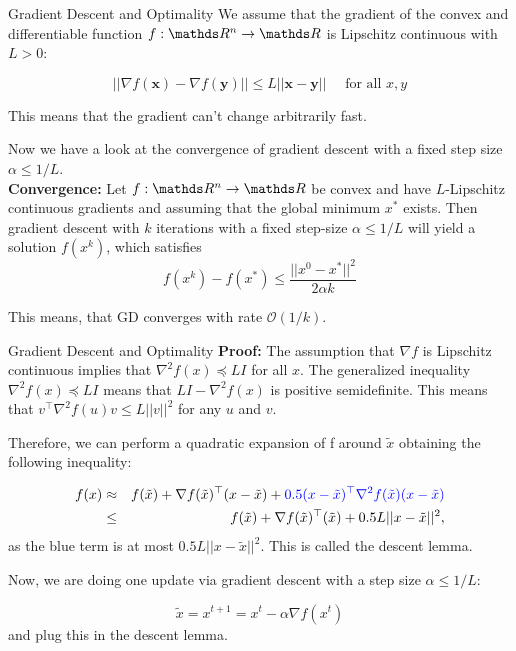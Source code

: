 \begin{vbframe}{Gradient Descent and Optimality}
			We assume that the gradient of the convex and differentiable function $f: \R^n \rightarrow \R$ is Lipschitz continuous with $L > 0$: 
		
			\begin{equation*}
			|| \nabla f(\bm{x}) - \nabla f(\bm{y}) || \le L ||\bm{x} - \bm{y} || \quad \text{ for all } x, y
			\end{equation*}
			
			This means that the gradient can't change arbitrarily fast. 
			
			\lz 
			
			Now we have a look at the convergence of gradient descent with a fixed step size $\alpha \leq 1/L$. \\
			\textbf{Convergence:} Let $f:\R^n \to \R$ be convex and have $L$-Lipschitz continuous gradients and assuming that the global minimum ${x}^\ast$ exists. Then gradient descent with $k$ iterations with a fixed step-size $\alpha \leq 1/L$ will yield a solution $f(x^k)$, which satisfies
			$$
				f({x}^k) - f({x}^\ast) \leq \frac{|| {x}^0 - {x}^\ast ||^2}{2\alpha k}
			$$
			
			This means, that GD converges with rate $\mathcal{O}(1/k)$.
			\framebreak 
		\end{vbframe}
		\begin{frame}{Gradient Descent and Optimality}
			\textbf{Proof: }
			The assumption that $\nabla f$ is Lipschitz continuous implies that $\nabla^2 f(x) \preccurlyeq L I$ for all $x$. The generalized inequality $\nabla^2 f(x) \preccurlyeq L I$ means that $L I - \nabla^2 f(x)$ is positive semidefinite. This means that $v^\top \nabla^2 f(u) v \leq L ||v||^2$ for any $u$ and $v$. 
			
			Therefore, we can perform a quadratic expansion of f around $\tilde{x}$ obtaining the following inequality: 

			\begin{eqnarray*}
				f(x) &\approx& f(\tilde{x}) + \nabla f(\tilde{x})^\top (x - \tilde{x}) + \textcolor{blue}{0.5  (x - \tilde{x})^\top \nabla^2 f(\tilde{x}) (x - \tilde{x})} \\
				& \leq & f(\tilde{x}) + \nabla f(\tilde{x})^\top (\tilde{x}) + 0.5 L ||x - \tilde{x}||^2,
			\end{eqnarray*}		
			as the blue term is at most $0.5 L ||x - \tilde{x}||^2$. This is called the descent lemma. 
			
			Now, we are doing one update via gradient descent with a step size $\alpha \leq 1/L$: 

			$$
			\tilde{x} = x^{t+1} = x^{t} - \alpha \nabla f(x^{t})
			$$ 
			and plug this in the descent lemma.
			

		\end{frame}

